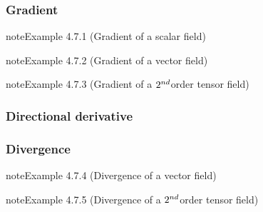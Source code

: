 \documentclass[letterpaper,10pt,english]{jupyterBook}
\begin{document}
\subsubsection{Gradient}
\label{\detokenize{ch/tensor-algebra-calculus/calculus-euclidean-spherical:gradient}}\label{\detokenize{ch/tensor-algebra-calculus/calculus-euclidean-spherical:tensor-calculus-spherical-differential-operators-gradient}}\label{ch/tensor-algebra-calculus/calculus-euclidean-spherical:example-0}
\begin{sphinxadmonition}{note}{Example 4.7.1 (Gradient of a scalar field)}


\end{sphinxadmonition}
\label{ch/tensor-algebra-calculus/calculus-euclidean-spherical:example-1}
\begin{sphinxadmonition}{note}{Example 4.7.2 (Gradient of a vector field)}


\end{sphinxadmonition}
\label{ch/tensor-algebra-calculus/calculus-euclidean-spherical:example-2}
\begin{sphinxadmonition}{note}{Example 4.7.3 (Gradient of a \protect\(2^{nd}\protect\)\sphinxhyphen{}order tensor field)}


\end{sphinxadmonition}


\subsubsection{Directional derivative}
\label{\detokenize{ch/tensor-algebra-calculus/calculus-euclidean-spherical:directional-derivative}}\label{\detokenize{ch/tensor-algebra-calculus/calculus-euclidean-spherical:tensor-calculus-spherical-differential-operators-directional-der}}

\subsubsection{Divergence}
\label{\detokenize{ch/tensor-algebra-calculus/calculus-euclidean-spherical:divergence}}\label{\detokenize{ch/tensor-algebra-calculus/calculus-euclidean-spherical:tensor-calculus-spherical-differential-operators-divergence}}\label{ch/tensor-algebra-calculus/calculus-euclidean-spherical:example-3}
\begin{sphinxadmonition}{note}{Example 4.7.4 (Divergence of a vector field)}


\end{sphinxadmonition}
\label{ch/tensor-algebra-calculus/calculus-euclidean-spherical:example-4}
\begin{sphinxadmonition}{note}{Example 4.7.5 (Divergence of a \protect\(2^{nd}\protect\)\sphinxhyphen{}order tensor field)}


\end{sphinxadmonition}
\end{document}
